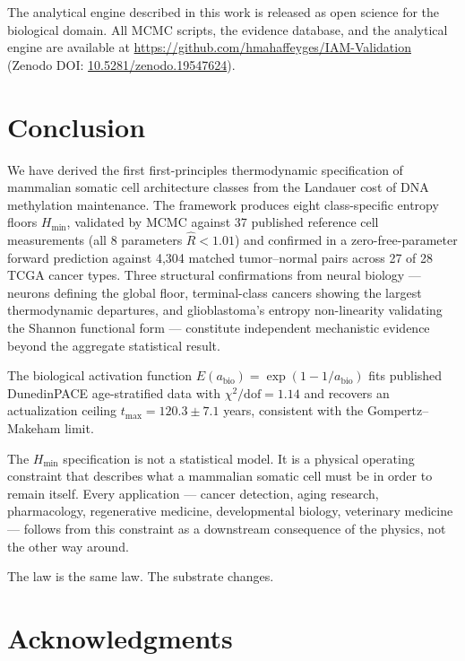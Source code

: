 \documentclass[12pt,a4paper]{article}
\newcommand{\Hmin}{H_{\min}}
\begin{document}
The analytical engine described in this work is released as open science
for the biological domain. All MCMC scripts, the evidence database, and
the analytical engine are available at
\url{https://github.com/hmahaffeyges/IAM-Validation}
(Zenodo DOI: \href{https://doi.org/10.5281/zenodo.19547624}{10.5281/zenodo.19547624}).

\section{Conclusion}
\label{sec:conclusion}

We have derived the first first-principles thermodynamic specification of
mammalian somatic cell architecture classes from the Landauer cost of DNA
methylation maintenance. The framework produces eight class-specific entropy
floors $\Hmin$, validated by MCMC against 37 published reference cell
measurements (all 8 parameters $\hat{R} < 1.01$) and confirmed in a
zero-free-parameter forward prediction against 4,304 matched tumor--normal
pairs across 27 of 28 TCGA cancer types. Three structural confirmations
from neural biology --- neurons defining the global floor, terminal-class
cancers showing the largest thermodynamic departures, and glioblastoma's
entropy non-linearity validating the Shannon functional form --- constitute
independent mechanistic evidence beyond the aggregate statistical result.

The biological activation function $E(a_{\mathrm{bio}}) = \exp(1-1/a_{\mathrm{bio}})$
fits published DunedinPACE age-stratified data with $\chi^2/\mathrm{dof} = 1.14$
and recovers an actualization ceiling $t_{\max} = 120.3 \pm 7.1$ years,
consistent with the Gompertz--Makeham limit.

The $\Hmin$ specification is not a statistical model. It is a physical
operating constraint that describes what a mammalian somatic cell must be
in order to remain itself. Every application --- cancer detection, aging
research, pharmacology, regenerative medicine, developmental biology,
veterinary medicine --- follows from this constraint as a downstream
consequence of the physics, not the other way around.

The law is the same law. The substrate changes.

\section*{Acknowledgments}
\end{document}
